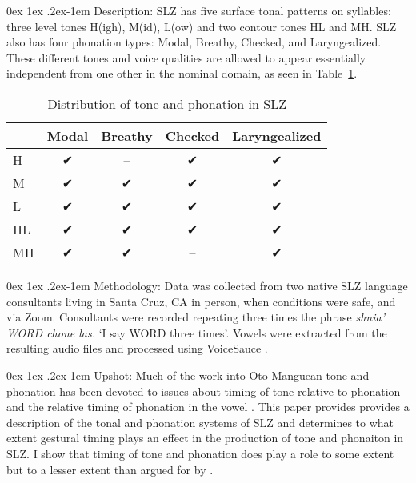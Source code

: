 \documentclass[12pt, letterpaper]{article}
\makeatletter
\renewcommand{\paragraph}{%
  \@startsection{paragraph}{4}%
  {\z@}{0ex \@plus 1ex \@minus .2ex}{-1em}%
  {\normalfont\normalsize\bfseries}%
}
\makeatother
\begin{document}
\paragraph{Description:} 
SLZ has five surface tonal patterns on syllables: three level tones H(igh), M(id), L(ow) and two contour tones HL and MH.
SLZ also has four phonation types: Modal, Breathy, Checked, and Laryngealized. 
These different tones and voice qualities are allowed to appear essentially independent from one other in the nominal domain, as seen in Table~\ref{tab:ToneVoiceQuality}.
\vspace{-20pt}
\begin{table}[!h]
	\caption{Distribution of tone and phonation in SLZ}
	\label{tab:ToneVoiceQuality}
	\centering

	\begin{tabular}{lcccc}
	\hline

	\hline
		& \textbf{Modal} & \textbf{Breathy} & \textbf{Checked} & \textbf{Laryngealized} \\
	\hline
	H	& ✔ & -- & ✔ & ✔ \\
	M	& ✔ & ✔ & ✔ & ✔\\
	L	& ✔	& ✔ & ✔ & ✔\\
	HL	& ✔	& ✔ & ✔ & ✔\\
	MH	& ✔	& ✔ & -- & ✔ \\
	\hline

	\hline
	\end{tabular}
\end{table}

\paragraph{Methodology:} 
Data was collected from two native SLZ language consultants living in Santa Cruz, CA in person, when conditions were safe, and via Zoom. 
Consultants were recorded repeating three times the phrase \textit{shnia' WORD chone las.} `I say WORD three times'.
Vowels were extracted from the resulting audio files and processed using VoiceSauce \citep{shueVOICESAUCEProgramVoice2009}.

\paragraph{Upshot:}
Much of the work into Oto-Manguean tone and phonation has been devoted to issues about timing of tone relative to phonation and the relative timing of phonation in the vowel \citep{silvermanLaryngealComplexityOtomanguean1997,blankenshipTimingNonmodalPhonation2002}. This paper provides provides a description of the tonal and phonation systems of SLZ and determines to what extent gestural timing plays an effect in the production of tone and phonaiton in SLZ. I show that timing of tone and phonation does play a role to some extent but to a lesser extent than argued for by \citet{silvermanLaryngealComplexityOtomanguean1997}. 



\newpage
\thispagestyle{empty}
\printbibliography[heading=bibintoc]
\end{document}
